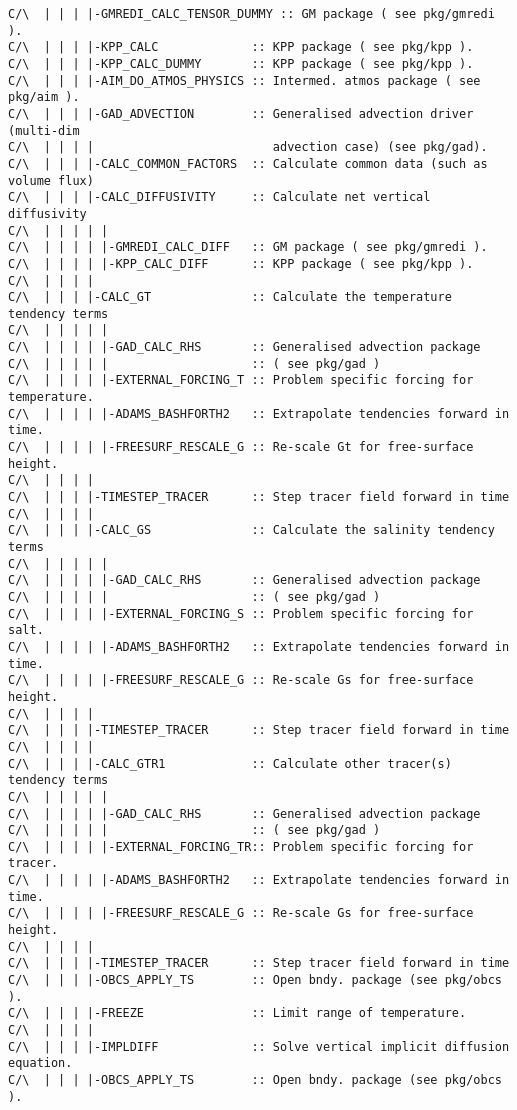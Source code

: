 {\begin{verbatim}
C/\  | | | |-GMREDI_CALC_TENSOR_DUMMY :: GM package ( see pkg/gmredi ). 
C/\  | | | |-KPP_CALC             :: KPP package ( see pkg/kpp ).
C/\  | | | |-KPP_CALC_DUMMY       :: KPP package ( see pkg/kpp ).
C/\  | | | |-AIM_DO_ATMOS_PHYSICS :: Intermed. atmos package ( see pkg/aim ).
C/\  | | | |-GAD_ADVECTION        :: Generalised advection driver (multi-dim
C/\  | | | |                         advection case) (see pkg/gad).
C/\  | | | |-CALC_COMMON_FACTORS  :: Calculate common data (such as volume flux)
C/\  | | | |-CALC_DIFFUSIVITY     :: Calculate net vertical diffusivity
C/\  | | | | |
C/\  | | | | |-GMREDI_CALC_DIFF   :: GM package ( see pkg/gmredi ).
C/\  | | | | |-KPP_CALC_DIFF      :: KPP package ( see pkg/kpp ).
C/\  | | | |
C/\  | | | |-CALC_GT              :: Calculate the temperature tendency terms
C/\  | | | | |
C/\  | | | | |-GAD_CALC_RHS       :: Generalised advection package 
C/\  | | | | |                    :: ( see pkg/gad )
C/\  | | | | |-EXTERNAL_FORCING_T :: Problem specific forcing for temperature.
C/\  | | | | |-ADAMS_BASHFORTH2   :: Extrapolate tendencies forward in time.
C/\  | | | | |-FREESURF_RESCALE_G :: Re-scale Gt for free-surface height.
C/\  | | | |
C/\  | | | |-TIMESTEP_TRACER      :: Step tracer field forward in time
C/\  | | | |
C/\  | | | |-CALC_GS              :: Calculate the salinity tendency terms
C/\  | | | | |
C/\  | | | | |-GAD_CALC_RHS       :: Generalised advection package 
C/\  | | | | |                    :: ( see pkg/gad )
C/\  | | | | |-EXTERNAL_FORCING_S :: Problem specific forcing for salt.
C/\  | | | | |-ADAMS_BASHFORTH2   :: Extrapolate tendencies forward in time.
C/\  | | | | |-FREESURF_RESCALE_G :: Re-scale Gs for free-surface height.
C/\  | | | |
C/\  | | | |-TIMESTEP_TRACER      :: Step tracer field forward in time
C/\  | | | |
C/\  | | | |-CALC_GTR1            :: Calculate other tracer(s) tendency terms
C/\  | | | | |
C/\  | | | | |-GAD_CALC_RHS       :: Generalised advection package 
C/\  | | | | |                    :: ( see pkg/gad )
C/\  | | | | |-EXTERNAL_FORCING_TR:: Problem specific forcing for tracer.
C/\  | | | | |-ADAMS_BASHFORTH2   :: Extrapolate tendencies forward in time.
C/\  | | | | |-FREESURF_RESCALE_G :: Re-scale Gs for free-surface height.
C/\  | | | |
C/\  | | | |-TIMESTEP_TRACER      :: Step tracer field forward in time
C/\  | | | |-OBCS_APPLY_TS        :: Open bndy. package (see pkg/obcs ).
C/\  | | | |-FREEZE               :: Limit range of temperature.
C/\  | | | |
C/\  | | | |-IMPLDIFF             :: Solve vertical implicit diffusion equation.
C/\  | | | |-OBCS_APPLY_TS        :: Open bndy. package (see pkg/obcs ). 

\end{verbatim}}
